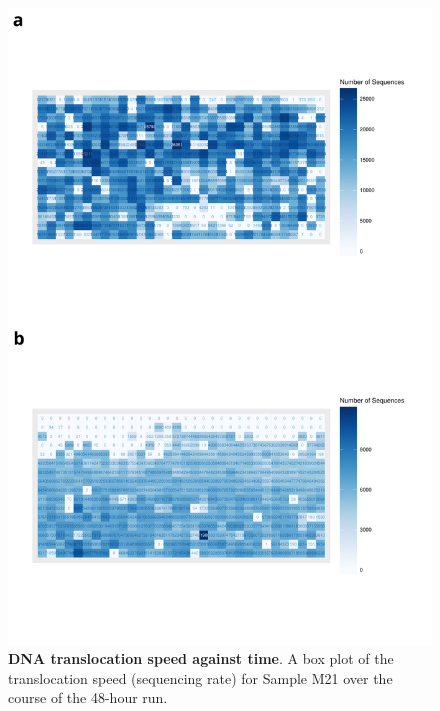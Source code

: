 \begin{figure}[htp]
	\begin{center}
		\includegraphics[page=4,trim={1cm 0cm 0cm 20cm},clip, scale = 0.45]{Figures/ONTWholeTranscriptome.pdf}
	\end{center}
	\captionsetup{width=0.95\textwidth}
	\caption[ONT translocation speed against time from Whole Transcriptome Sequencing]%
	{\textbf{DNA translocation speed against time}. A box plot of the translocation speed (sequencing rate) for Sample M21 over the course of the 48-hour run. }
	\label{fig:ont_speedvstime}
\end{figure}

